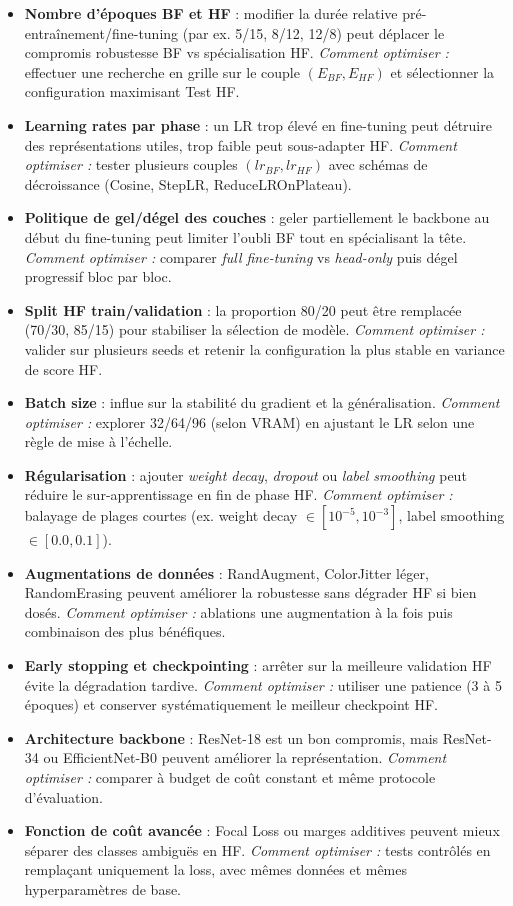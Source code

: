 \documentclass[11pt,a4paper,openany]{book}
\begin{document}
\begin{itemize}
  \item \textbf{Nombre d'époques BF et HF} : modifier la durée relative pré-entraînement/fine-tuning (par ex. 5/15, 8/12, 12/8) peut déplacer le compromis robustesse BF vs spécialisation HF. \textit{Comment optimiser :} effectuer une recherche en grille sur le couple $(E_{BF}, E_{HF})$ et sélectionner la configuration maximisant Test HF.
  \item \textbf{Learning rates par phase} : un LR trop élevé en fine-tuning peut détruire des représentations utiles, trop faible peut sous-adapter HF. \textit{Comment optimiser :} tester plusieurs couples $(lr_{BF}, lr_{HF})$ avec schémas de décroissance (Cosine, StepLR, ReduceLROnPlateau).
  \item \textbf{Politique de gel/dégel des couches} : geler partiellement le backbone au début du fine-tuning peut limiter l'oubli BF tout en spécialisant la tête. \textit{Comment optimiser :} comparer \textit{full fine-tuning} vs \textit{head-only} puis dégel progressif bloc par bloc.
  \item \textbf{Split HF train/validation} : la proportion 80/20 peut être remplacée (70/30, 85/15) pour stabiliser la sélection de modèle. \textit{Comment optimiser :} valider sur plusieurs seeds et retenir la configuration la plus stable en variance de score HF.
  \item \textbf{Batch size} : influe sur la stabilité du gradient et la généralisation. \textit{Comment optimiser :} explorer 32/64/96 (selon VRAM) en ajustant le LR selon une règle de mise à l'échelle.
  \item \textbf{Régularisation} : ajouter \textit{weight decay}, \textit{dropout} ou \textit{label smoothing} peut réduire le sur-apprentissage en fin de phase HF. \textit{Comment optimiser :} balayage de plages courtes (ex. weight decay $\in [10^{-5},10^{-3}]$, label smoothing $\in [0.0,0.1]$).
  \item \textbf{Augmentations de données} : RandAugment, ColorJitter léger, RandomErasing peuvent améliorer la robustesse sans dégrader HF si bien dosés. \textit{Comment optimiser :} ablations une augmentation à la fois puis combinaison des plus bénéfiques.
  \item \textbf{Early stopping et checkpointing} : arrêter sur la meilleure validation HF évite la dégradation tardive. \textit{Comment optimiser :} utiliser une patience (3 à 5 époques) et conserver systématiquement le meilleur checkpoint HF.
  \item \textbf{Architecture backbone} : ResNet-18 est un bon compromis, mais ResNet-34 ou EfficientNet-B0 peuvent améliorer la représentation. \textit{Comment optimiser :} comparer à budget de coût constant et même protocole d'évaluation.
  \item \textbf{Fonction de coût avancée} : Focal Loss ou marges additives peuvent mieux séparer des classes ambiguës en HF. \textit{Comment optimiser :} tests contrôlés en remplaçant uniquement la loss, avec mêmes données et mêmes hyperparamètres de base.
\end{itemize}
\end{document}
